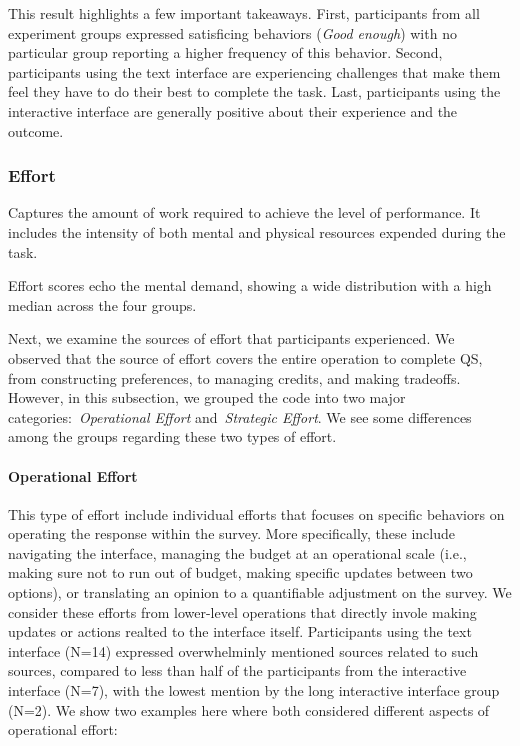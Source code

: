 This result highlights a few important takeaways. First, participants from all experiment groups expressed satisficing behaviors (\textit{Good enough}) with no particular group reporting a higher frequency of this behavior. Second, participants using the text interface are experiencing challenges that make them feel they have to do their best to complete the task. Last, participants using the interactive interface are generally positive about their experience and the outcome.




\subsubsection{Effort}
Captures the amount of work required to achieve the level of performance. It includes the intensity of both mental and physical resources expended during the task.

Effort scores echo the mental demand, showing a wide distribution with a high median across the four groups. 

Next, we examine the sources of effort that participants experienced. We observed that the source of effort covers the entire operation to complete QS, from constructing preferences, to managing credits, and making tradeoffs. However, in this subsection, we grouped the code into two major categories:~\textit{Operational Effort} and~\textit{Strategic Effort}. We see some differences among the groups regarding these two types of effort.

\paragraph{Operational Effort} This type of effort include individual efforts that focuses on specific behaviors on operating the response within the survey. More specifically, these include navigating the interface, managing the budget at an operational scale (i.e., making sure not to run out of budget, making specific updates between two options), or translating an opinion to a quantifiable adjustment on the survey. We consider these efforts from lower-level operations that directly invole making updates or actions realted to the interface itself. Participants using the text interface (N=14) expressed overwhelminly mentioned sources related to such sources, compared to less than half of the participants from the interactive interface (N=7), with the lowest mention by the long interactive interface group (N=2). We show two examples here where both considered different aspects of operational effort:

